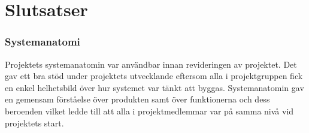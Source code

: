 \chapter{Slutsatser}
\label{cha:conclusion}

\subsection{Systemanatomi}
Projektets systemanatomin var användbar innan revideringen av projektet. Det gav ett bra stöd under projektets utvecklande eftersom alla i projektgruppen fick en enkel helhetsbild över hur systemet var tänkt att byggas. Systemanatomin gav en gemensam förståelse över produkten samt över funktionerna och dess beroenden vilket ledde till att alla i projektmedlemmar var på samma nivå vid projektets start.




